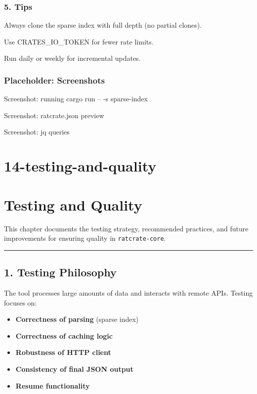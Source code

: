 \documentclass[
  letterpaper,
  DIV=11,
  numbers=noendperiod]{scrreprt}
\providecommand{\tightlist}{%
  \setlength{\itemsep}{0pt}\setlength{\parskip}{0pt}}
\begin{document}
\subsection{5. Tips}\label{tips}

Always clone the sparse index with full depth (no partial clones).

Use CRATES\_IO\_TOKEN for fewer rate limits.

Run daily or weekly for incremental updates.

\subsection{Placeholder: Screenshots}\label{placeholder-screenshots}

Screenshot: running cargo run -- -s sparse-index

Screenshot: ratcrate.json preview

Screenshot: jq queries

\chapter{14-testing-and-quality}\label{testing-and-quality}

\chapter{Testing and Quality}\label{testing-and-quality-1}

This chapter documents the testing strategy, recommended practices, and
future improvements for ensuring quality in \texttt{ratcrate-core}.

\begin{center}\rule{0.5\linewidth}{0.5pt}\end{center}

\section{1. Testing Philosophy}\label{testing-philosophy}

The tool processes large amounts of data and interacts with remote APIs.
Testing focuses on:

\begin{itemize}
\tightlist
\item
  \textbf{Correctness of parsing} (sparse index)
\item
  \textbf{Correctness of caching logic}
\item
  \textbf{Robustness of HTTP client}
\item
  \textbf{Consistency of final JSON output}
\item
  \textbf{Resume functionality}
\end{itemize}
\end{document}

